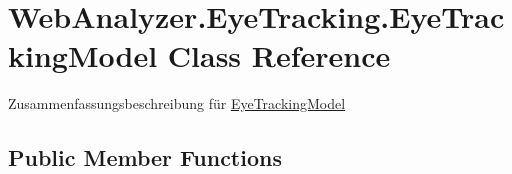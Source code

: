\hypertarget{class_web_analyzer_1_1_eye_tracking_1_1_eye_tracking_model}{}\section{Web\+Analyzer.\+Eye\+Tracking.\+Eye\+Tracking\+Model Class Reference}
\label{class_web_analyzer_1_1_eye_tracking_1_1_eye_tracking_model}


Zusammenfassungsbeschreibung für \hyperlink{class_web_analyzer_1_1_eye_tracking_1_1_eye_tracking_model}{Eye\+Tracking\+Model}  


\subsection*{Public Member Functions}
